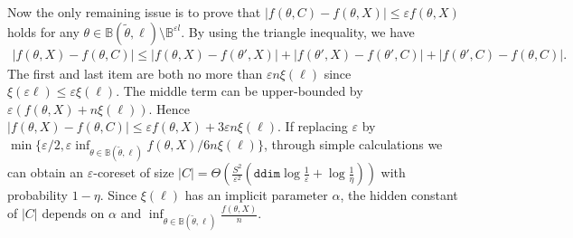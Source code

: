 Now the only remaining issue is to prove that $ |{f}(\theta,C)-{f}(\theta,X)|\leq \varepsilon {f}(\theta,X) $ holds for any $ \theta\in\mathbb{B}(\tilde{\theta},\ell)\setminus \mathbb{B}^{\varepsilon l}$. 
By using the triangle inequality,  we have
\begin{align*}
	\left|{f}(\theta,X)-{f}(\theta,C)\right|\leq \left|{f}(\theta,X)-{f}(\theta',X) \right|
	+\left|{f}(\theta',X)-{f}(\theta',C) \right|
	+\left|{f}(\theta',C)-{f}(\theta,C) \right|.
\end{align*}
The first and last item are both no more than $ \varepsilon n\xi(\ell) $ since $ \xi(\varepsilon\ell)\leq \varepsilon\xi(\ell) $. The middle term can be upper-bounded by $ \varepsilon ({f}(\theta,X)+n\xi(\ell)) $. Hence $ \left|{f}(\theta,X)-{f}(\theta,C)\right|\leq \varepsilon f(\theta,X)+3\varepsilon n\xi(\ell) $.
If replacing $ \varepsilon $ by $\min\{\varepsilon/2,\varepsilon\inf_{\theta\in\mathbb{B}(\tilde{\theta},\ell)}f(\theta,X)/6n\xi(\ell) \} $, through simple calculations we can obtain an $ \varepsilon $-coreset of size $|C|=\Theta\left(\frac{S^2}{\varepsilon^2}\left(\mathtt{ddim}\log\frac{1}{\varepsilon}+\log\frac{1}{\eta}\right) \right)$ with probability $ 1-\eta $. Since $ \xi(\ell) $ has an implicit parameter $\alpha$, the hidden constant of $|C|$ depends on $\alpha$ and $\inf_{\theta\in\mathbb{B}(\tilde{\theta},\ell)}\frac{f(\theta,X)}{n}$.




